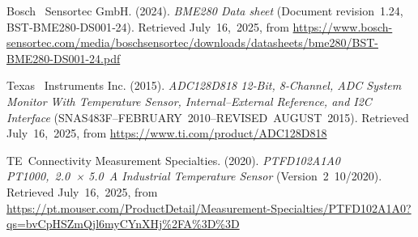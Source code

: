 \documentclass[onecolumn]{article}
\begin{document}
\small
\begin{thebibliography}{10}


Bosch \ Sensortec GmbH. (2024). \emph{BME280 Data sheet} (Document revision\ 1.24, BST‑BME280‑DS001‑24). Retrieved July\ 16,\ 2025, from \url{https://www.bosch-sensortec.com/media/boschsensortec/downloads/datasheets/bme280/BST-BME280-DS001-24.pdf}

Texas \ Instruments Inc. (2015). \emph{ADC128D818 12‑Bit, 8‑Channel, ADC System Monitor With Temperature Sensor, Internal–External Reference, and I2C Interface} (SNAS483F–FEBRUARY\ 2010–REVISED\ AUGUST\ 2015). Retrieved July\ 16,\ 2025, from \url{https://www.ti.com/product/ADC128D818}

TE\ Connectivity Measurement Specialties. (2020). \emph{PTFD102A1A0 PT1000,\ 2.0\ × 5.0\ A Industrial Temperature Sensor} (Version\ 2\ 10/2020). Retrieved July\ 16,\ 2025, from \url{https://pt.mouser.com/ProductDetail/Measurement-Specialties/PTFD102A1A0?qs=bvCpHSZmQjl6myCYnXHj%2FA%3D%3D}



\end{thebibliography}

\newpage
\appendix

\vspace{-2em}
\end{document}
